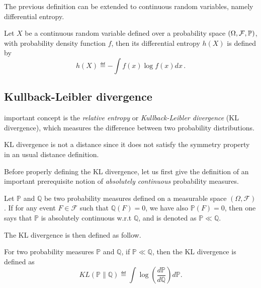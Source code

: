 The previous definition can be extended to continuous random variables, namely \gls{differential entropy}.

\begin{definition}
\begin{leftbar}[defnbar]
    Let $X$ be a continuous random variable defined over a probability space $(\Omega,\mathcal{F},\mathbb{P})$, with probability density function $f$, then its differential entropy $h(X)$ is defined by
    \[
        h(X) \eqdef - \int f(x)\log f(x) dx\,.
    \]
\end{leftbar}
\end{definition}

\subsection{Kullback-Leibler divergence}\label{app:maths.information.kl}

 important concept is the \textit{relative entropy} or \textit{Kullback-Leibler divergence} (KL divergence), which measures the difference between two probability distributions.

\begin{remark}
\begin{leftbar}[remarkbar]
	KL divergence is not a distance since it does not satisfy the symmetry property in an usual distance definition.
\end{leftbar}
\end{remark}

Before properly defining the KL divergence, let us first give the definition of an important prerequisite notion of \textit{absolutely continuous} probability measures.

\begin{definition}\label{def:maths.absolute_continuous}
\begin{leftbar}[defnbar]
	Let $\mathbb{P}$ and $\mathbb{Q}$ be two probability measures defined on a measurable space $(\Omega,\mathcal{F})$. If for any event $F \in \mathcal{F}$ such that $\mathbb{Q}(F) = 0$, we have also $\mathbb{P}(F) = 0$, then one says that $\mathbb{P}$ is absolutely continuous w.r.t $\mathbb{Q}$, and is denoted as $\mathbb{P} \ll \mathbb{Q}$.
\end{leftbar}
\end{definition}

The KL divergence is then defined as follow.

\begin{definition}[KL divergence]\label{def:maths.kl}
\begin{leftbar}[defnbar]
	For two probability measures $\mathbb{P}$ and $\mathbb{Q}$, if $\mathbb{P} \ll \mathbb{Q}$, then the KL divergence is defined as
	\[
		KL(\mathbb{P} \lVert \mathbb{Q}) \eqdef \int \log(\frac{d\mathbb{P}}{d\mathbb{Q}})d\mathbb{P}.
	\]
\end{leftbar}
\end{definition}

